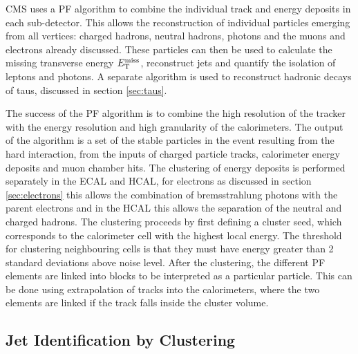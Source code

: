 CMS uses a \ac{PF} \cite{CMS-PAS-PFT-09-001,CMS-PAS-PFT-10-001,CMS-PAS-PFT-10-002} 
algorithm to combine the individual track and energy deposits in each sub-detector. 
This allows the reconstruction of individual particles emerging from all vertices: charged
hadrons, neutral hadrons, photons and the muons and electrons already discussed.
These particles can then be 
used to calculate the missing transverse energy $E_{\mathrm{T}}^{\text{miss}}$,
reconstruct jets and quantify the isolation of leptons and photons. A separate
algorithm is used to reconstruct hadronic decays of taus, discussed in section
\ref{sec:taus}. 

The success of the \ac{PF} algorithm is to combine the high resolution of
the tracker with the energy resolution and high granularity of the calorimeters.
The output of the algorithm is a set of the stable particles in the event
resulting from the hard interaction, from the inputs of charged particle tracks,
calorimeter energy deposits and muon chamber hits. The clustering of energy
deposits is performed separately in the \ac{ECAL} and \ac{HCAL}, for electrons
as discussed in section \ref{sec:electrons} this allows the combination of
bremsstrahlung photons with the parent electrons and in the \ac{HCAL} this
allows the separation of the neutral and charged hadrons. The clustering
proceeds by first defining a cluster seed, which corresponds to the calorimeter
cell with the highest local energy. The threshold for clustering neighbouring
cells is that they must have energy greater than 2 standard deviations above
noise level. After the clustering, the different \ac{PF} elements are linked into
blocks to be interpreted as a particular particle. This can be done using
extrapolation of tracks into the calorimeters, where the two elements are linked
if the track falls inside the cluster volume.

\subsection{Jet Identification by Clustering}
\label{sec:jetID}

